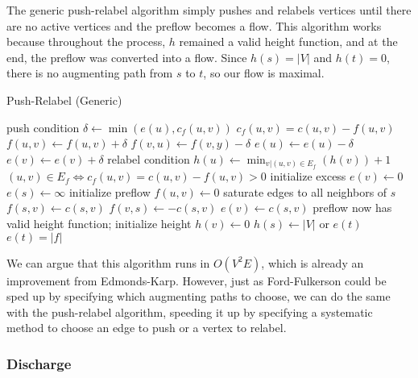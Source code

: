 The generic push-relabel algorithm simply pushes and relabels vertices until there are no active vertices and the preflow becomes a flow. This algorithm works because throughout the process, $h$ remained a valid height function, and at the end, the preflow was converted into a flow. Since $h(s) = |V|$ and $h(t) = 0$, there is no augmenting path from $s$ to $t$, so our flow is maximal.

\begin{algorithm}[H]
\caption{Push-Relabel (Generic)}
\begin{algorithmic}
		\Comment push condition
		\State $\delta \gets \min(e(u), c_f(u,v))$
		\Comment $c_f(u,v) = c(u,v) - f(u,v)$
		\State $f(u,v) \gets f(u,v) + \delta$
		\State $f(v,u) \gets f(v,y) - \delta$
		\State $e(u) \gets e(u) - \delta$
		\State $e(v) \gets e(v) + \delta$
	\EndIf
\EndFunction
{}
		\Comment relabel condition
		\State $h(u) \gets \min_{v | (u,v) \in E_f}(h(v)) + 1$
		\Comment $(u,v) \in E_f \iff c_f(u,v) = c(u,v) - f(u,v) > 0$
	\EndIf
\EndFunction
{}
		\Comment initialize excess
		\State $e(v) \gets 0$
	\EndFor
	\State $e(s) \gets \infty$
		\Comment initialize preflow
		\State $f(u,v) \gets 0$
	\EndFor
		\Comment saturate edges to all neighbors of $s$
		\State $f(s,v) \gets c(s,v)$
		\State $f(v,s) \gets -c(s,v)$
		\State $e(v) \gets c(s,v)$
	\EndFor
		\Comment preflow now has valid height function; initialize height
		\State $h(v) \gets 0$
	\EndFor
	\State $h(s) \gets |V|$
		\State {} or 
	\EndWhile
	\State \Return $e(t)$
	\Comment $e(t)=|f|$
\EndFunction
\end{algorithmic}
\end{algorithm}

We can argue that this algorithm runs in $O(V^2E)$, which is already an improvement from Edmonds-Karp. However, just as Ford-Fulkerson could be sped up by specifying which augmenting paths to choose, we can do the same with the push-relabel algorithm, speeding it up by specifying a systematic method to choose an edge to push or a vertex to relabel.

\subsubsection{Discharge}

